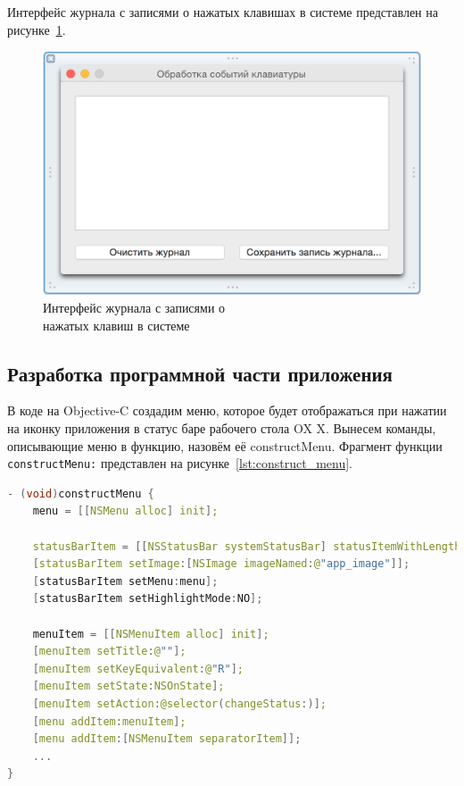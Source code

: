 Интерфейс журнала с записями о нажатых клавишах в системе представлен
на рисунке~\ref{pic:log_window}.
\begin{figure}[h!]
  \centering
  \includegraphics[width=150mm]{pic/log_window.png}
  \caption{Интерфейс журнала с записями о \\ нажатых клавиш в системе}
  \label{pic:log_window}
\end{figure}

\subsection{Разработка программной части приложения}

В коде на Objective-C создадим меню, которое будет отображаться при нажатии на
иконку приложения в статус баре рабочего стола OX X. Вынесем команды, описывающие
меню в функцию, назовём её constructMenu. Фрагмент функции \texttt{constructMenu:}
представлен на рисунке~\ref{lst:construct_menu}.
\begin{lstlisting}[basicstyle=\scriptsize\ttfamily,
                   numberstyle=\scriptsize\ttfamily,
                   xleftmargin=7mm,
                   language=C++,caption=Фрагмент функции \texttt{constructMenu:},
                   label=lst:construct_menu]
- (void)constructMenu {
    menu = [[NSMenu alloc] init];

    statusBarItem = [[NSStatusBar systemStatusBar] statusItemWithLength:NSVariableStatusItemLength];
    [statusBarItem setImage:[NSImage imageNamed:@"app_image"]];
    [statusBarItem setMenu:menu];
    [statusBarItem setHighlightMode:NO];

    menuItem = [[NSMenuItem alloc] init];
    [menuItem setTitle:@""];
    [menuItem setKeyEquivalent:@"R"];
    [menuItem setState:NSOnState];
    [menuItem setAction:@selector(changeStatus:)];
    [menu addItem:menuItem];
    [menu addItem:[NSMenuItem separatorItem]];
    ...
}
\end{lstlisting}

